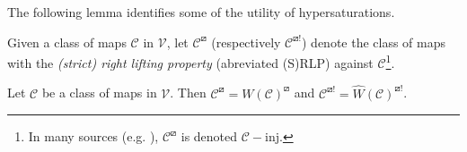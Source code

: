 \documentclass[a4paper,10pt,draft]{article}%
\begin{document}
The following lemma identifies some of the utility of hypersaturations.
\begin{notation}
      Given a class of maps $\mathcal C$ in $\mathcal V$, let $\mathcal C^\boxslash$ (respectively $\mathcal C^{\boxslash !}$)
      denote the class of maps with the
      \textit{(strict) right lifting property} (abreviated (S)RLP) against $\mathcal C$\footnote{
        In many sources (e.g. \cite{Hov99}), $\mathcal C^\boxslash$ is denoted $\mathcal C - \mbox{inj}$.
      }.
\end{notation}
\begin{lemma}
      \label{HYPER_LP_THM}
      Let $\mathcal C$ be a class of maps in $\mathcal V$. Then
      $\mathcal C^{\boxslash}= W(\mathcal C)^{\boxslash}$
      and
      $\mathcal C^{\boxslash !} = \hat{W}(\mathcal C)^{\boxslash !}$.
\end{lemma}
\end{document}
